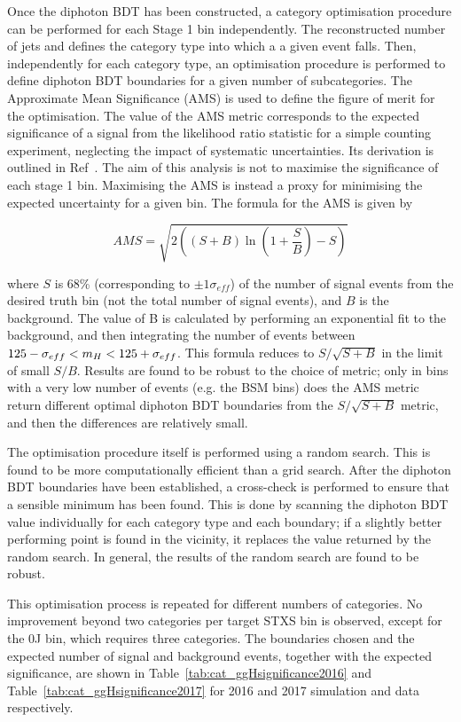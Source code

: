 Once the diphoton BDT has been constructed, 
a category optimisation procedure can be performed for each Stage 1 bin independently.
The reconstructed number of jets and \ptgg defines the category type into which a a given event falls.
Then, independently for each category type, 
an optimisation procedure is performed to define diphoton BDT boundaries 
for a given number of subcategories.
The Approximate Mean Significance (AMS) is used to define the figure of merit for the optimisation.
The value of the AMS metric corresponds to the expected significance of a signal 
from the likelihood ratio statistic for a simple counting experiment, 
neglecting the impact of systematic uncertainties.
Its derivation is outlined in Ref~\cite{Asymptotic}.
The aim of this analysis is not to maximise the significance of each stage 1 bin.
Maximising the AMS is instead a proxy for minimising the expected uncertainty for a given bin.
The formula for the AMS is given by 

\begin{equation*}
  AMS = \sqrt{ 2 \left( (S+B) \ln{\left(1+\frac{S}{B}\right)} - S \right) }
\end{equation*}

where $S$ is 68\% (corresponding to $\pm 1\sigma_{eff}$) of the number of signal events 
from the desired truth bin (not the total number of signal events), and $B$ is the background.
The value of B is calculated by performing an exponential fit to the background, 
and then integrating the number of events between $125 - \sigma_{eff} < m_{H} < 125 + \sigma_{eff}$.
This formula reduces to $S/\sqrt{S+B}$ in the limit of small $S/B$.
Results are found to be robust to the choice of metric; 
only in bins with a very low number of events (e.g. the BSM bins) 
does the AMS metric return different optimal diphoton BDT boundaries from the $S/\sqrt{S+B}$ metric, 
and then the differences are relatively small.

The optimisation procedure itself is performed using a random search. 
This is found to be more computationally efficient than a grid search.
After the diphoton BDT boundaries have been established, 
a cross-check is performed to ensure that a sensible minimum has been found.
This is done by scanning the diphoton BDT value individually for each category type and each boundary; 
if a slightly better performing point is found in the vicinity, 
it replaces the value returned by the random search.
In general, the results of the random search are found to be robust.

This optimisation process is repeated for different numbers of categories.
No improvement beyond two categories per target STXS bin is observed, 
except for the 0J bin, which requires three categories.
The boundaries chosen and the expected number of signal and background events, 
together with the expected significance, 
are shown in Table~\ref{tab:cat_ggHsignificance2016} and Table~\ref{tab:cat_ggHsignificance2017} 
for 2016 and 2017 simulation and data respectively.

